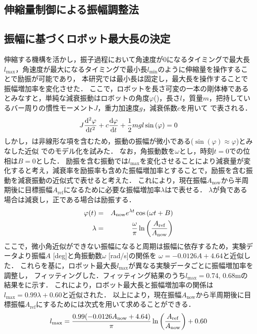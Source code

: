 \begin{small}
\section{伸縮量制御による振幅調整法}
\vspace{-2mm}
\subsection{振幅に基づくロボット最大長の決定}
伸縮する機構を活かし，振子過程において角速度が0になるタイミングで最大長$l_{\mathrm{max}}$，角速度が最大になるタイミングで最小長$l_{\mathrm{min}}$のように伸縮量を操作することで励振が可能であり，
本研究では最小長は固定し，最大長を操作することで振幅増加率を変化させた．
ここで，ロボットを長さ可変の一本の剛体棒であるとみなすと，単純な減衰振動はロボットの角度$\varphi$()，長さ$l$，質量$m$，把持しているバー周りの慣性モーメント$J$，重力加速度$g$，減衰係数$c$を用いて
で表される．
\vspace{-2mm}
\begin{eqnarray}
  \equlabel{equation}
  J \frac{\mathrm{d}^2 \varphi}{\mathrm{d} t^2} +c \frac{\mathrm{d}\varphi}{\mathrm{d} t}+\frac{1}{2}mgl \sin{(\varphi)}=0
\end{eqnarray}
しかし，は非線形な項を含むため，振動の振幅が微小である($\sin{(\varphi)}\approx \varphi$)とみなした近似
でのモデル化を試みた．
なお，角振動数を$\omega$とし，時刻$t=0$での位相は$B=0$とした．
励振を含む振動では$l_{\mathrm{max}}$を変化させることにより減衰量が変化すると考え，減衰率を励振率も含めた振幅増加率とすることで，励振を含む振動を減衰振動の近似式で表せると考えた．
これにより，現在振幅$A_{\mathrm{now}}$から半周期後に目標振幅$A_{\mathrm{ref}}$になるために必要な振幅増加率$\lambda$はで表せる．
$\lambda$が負である場合は減衰し，正である場合は励振する．
\vspace{-2mm}
\begin{eqnarray}
  \equlabel{Approximation Model}
  \varphi(t)&=&A_{\mathrm{now}}e^{\lambda t}\cos{(\omega t + B)}\\
  \equlabel{lambda}
            \lambda&=&\frac{\omega}{\pi}\ln{\left(\frac{A_{\mathrm{ref}}}{A_{\mathrm{now}}}\right)}
\end{eqnarray}
ここで，微小角近似ができない振幅になると周期は振幅に依存するため，実験データより振幅$A$ [deg]と角振動数$\omega$ [rad/s]の関係を
$\omega=-0.0126A+4.64$と近似した．
これらを基に，ロボット最大長$l_{\mathrm{max}}$が異なる実験データごとに振幅増加率を調整し，
フィッティングした．フィッティング結果のうち$l_{\mathrm{max}}=$0.74, 0.68mの結果をに示す．
これにより，ロボット最大長と振幅増加率の関係は$l_{\mathrm{max}}=0.99\lambda+0.60$と近似された．
以上により，現在振幅$A_{\mathrm{now}}$から半周期後に目標振幅$A_{\mathrm{ref}}$にするためには次式を用いて求めることができる．
\vspace{-1mm}
\begin{eqnarray}
  \equlabel{l status}
  l_{\mathrm{max}}=\frac{0.99(-0.0126A_{\mathrm{now}}+4.64)}{\pi}\ln{\left(\frac{A_{\mathrm{ref}}}{A_{\mathrm{now}}}\right)}+0.60 \nonumber
\end{eqnarray}

\end{small}
